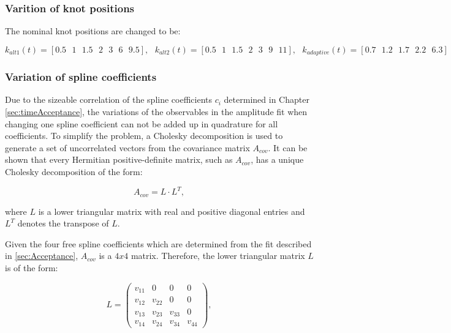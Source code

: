 \subsubsection{Varition of knot positions}
The nominal knot positions are changed to be:

\[ k_{alt1}(t) =  [0.5\mbox{ } 1 \mbox{ }1.5 \mbox{ }2 \mbox{ }3 \mbox{ }6 \mbox{ }9.5], 
\mbox{ } k_{alt2}(t) =  [0.5 \mbox{ } 1\mbox{ }  1.5 \mbox{ } 2 \mbox{ } 3\mbox{ }  9\mbox{ } 11],  
\mbox{ } k_{adaptive}(t) =  [0.7\mbox{ } 1.2\mbox{ } 1.7\mbox{ } 2.2\mbox{ } 6.3] \]


\subsubsection{Variation of spline coefficients}

Due to the sizeable correlation of the spline coefficients $c_{i}$ determined in Chapter \ref{sec:timeAcceptance}, 
the variations of the observables in the amplitude fit when changing one spline coefficient can not be added up in quadrature for all coefficients.
To simplify the problem, a Cholesky decomposition \cite{Golub:1996:MC:248979} is used to generate a set of uncorrelated vectors from the covariance matrix $A_{cov}$.
It can be shown that every Hermitian positive-definite matrix, such as $A_{cov}$, has a unique Cholesky decomposition of the form:

\begin{equation}
A_{cov} = L \cdot L^{T},
\label{eq:choleskyDecomp}
\end{equation}

where $L$ is a lower triangular matrix with real and positive diagonal entries and $L^{T}$ denotes the transpose of $L$. \newline

Given the four free spline coefficients which are determined from the fit described in \ref{sec:Acceptance}, $A_{cov}$ is a $4x4$ matrix. Therefore, the lower triangular matrix $L$ is of the form:

\begin{equation}
L = \begin{pmatrix}
v_{11} & 0 & 0 & 0 \\
v_{12} & v_{22} & 0 & 0 \\
v_{13} & v_{23} & v_{33} & 0\\ 
v_{14} & v_{24} & v_{34} & v_{44}
\end{pmatrix},
\label{eq:choleskyVectors}
\end{equation}


